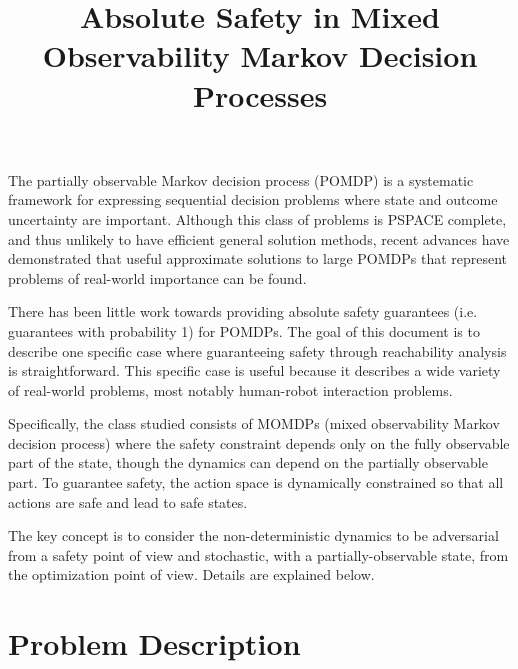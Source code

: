 \documentclass{article}
\title{Absolute Safety in Mixed Observability Markov Decision Processes}
\begin{document}
\maketitle

The partially observable Markov decision process (POMDP) is a systematic framework for expressing sequential decision problems where state and outcome uncertainty are important. Although this class of problems is PSPACE complete, and thus unlikely to have efficient general solution methods, recent advances have demonstrated that useful approximate solutions to large POMDPs that represent problems of real-world importance can be found.

There has been little work towards providing absolute safety guarantees (i.e. guarantees with probability 1) for POMDPs.
The goal of this document is to describe one specific case where guaranteeing safety through reachability analysis is straightforward.
This specific case is useful because it describes a wide variety of real-world problems, most notably human-robot interaction problems.

Specifically, the class studied consists of MOMDPs (mixed observability Markov decision process) where the safety constraint depends only on the fully observable part of the state, though the dynamics can depend on the partially observable part.
To guarantee safety, the action space is dynamically constrained so that all actions are safe and lead to safe states.

The key concept is to consider the non-deterministic dynamics to be adversarial from a safety point of view and stochastic, with a partially-observable state, from the optimization point of view.
Details are explained below.



\section{Problem Description}

\end{document}
